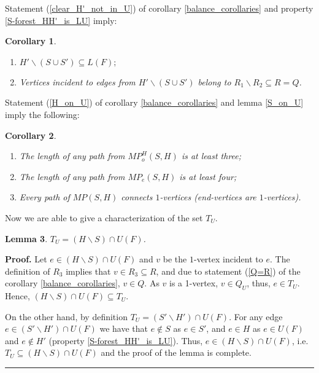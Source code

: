 \documentclass[a4paper, 12pt]{article}
\newtheorem{lemma}{Lemma}[subsection]
\newtheorem{corollary}[lemma]{Corollary}
\newenvironment{proof}[1][Proof]{\noindent\textbf{#1.} }{\ \rule{0.5em}{0.5em}}
\begin{document}
\bigskip

Statement (\ref{clear_H'_not_in_U}) of corollary
\ref{balance_corollaries} and property \ref{S-forest_HH'_is_LU}
imply:
\begin{corollary}\label{clear_H'_corollaries}\
\renewcommand{\labelenumi}{(\arabic{enumi})}
\begin{enumerate}
\item \label{clear_H' in_L}
$H' \backslash (S \cup S') \subseteq L(F);$

\item \label{clear_H'_inc_vertex_in_R}
Vertices incident to edges from $H' \backslash (S \cup S')$ belong
to $R_1 \backslash R_2 \subseteq R = Q$.
\end{enumerate}
\end{corollary}

\bigskip

Statement (\ref{H_on_U}) of corollary \ref{balance_corollaries} and
lemma \ref{S_on_U} imply the following:
\begin{corollary}\label{paths_corollaries}\
\renewcommand{\labelenumi}{(\arabic{enumi})}
\begin{enumerate}
\item \label{length_at_least_3}
The length of any path from $MP_o^H(S,H)$ is at least three;

\item \label{even_length_at_least_4}
The length of any path from $MP_e(S,H)$ is at least four;

\item \label{every_path_is 1-1}
Every path of $MP(S,H)$ connects $1$-vertices (end-vertices are
$1$-vertices).
\end{enumerate}
\end{corollary}

\bigskip

Now we are able to give a characterization of the set $T_U$.
\begin{lemma} \label{H_in_U_is_TU}
$T_U = (H \backslash S) \cap U(F)$.
\end{lemma}
\begin{proof}
Let $e \in (H \backslash S) \cap U(F)$ and $v$ be the $1$-vertex
incident to $e$. The definition of $R_3$ implies that $v \in R_3
\subseteq R$, and due to statement (\ref{Q=R}) of the corollary
\ref{balance_corollaries}, $v \in Q$. As $v$ is a 1-vertex, $v \in
Q_U$, thus, $e \in T_U$. Hence, $(H \backslash S) \cap U(F)
\subseteq T_U$.

On the other hand, by definition $T_U = (S' \backslash H') \cap
U(F)$. For any edge $e \in (S' \backslash H') \cap U(F)$ we have
that $e \notin S$ as $e \in S'$, and $e \in H$ as $e \in U(F)$ and
$e \notin H'$ (property \ref{S-forest_HH'_is_LU}). Thus, $e \in (H
\backslash S) \cap U(F)$, i.e. $T_U \subseteq (H \backslash S) \cap
U(F)$ and the proof of the lemma is complete.
\end{proof}
\end{document}
